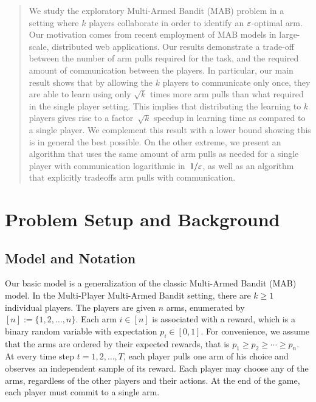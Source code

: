 \documentclass[12pt]{article}
\begin{document}
\begin{abstract}
We study the exploratory Multi-Armed Bandit (MAB) problem in a setting where $k$ players collaborate in order to identify an $\varepsilon$-optimal arm.
Our motivation comes from recent employment of MAB models in large-scale, distributed web applications.
Our results demonstrate a trade-off between the number of arm pulls required for
the task, and the required amount of communication between the players.
In particular, our main result shows that by allowing the $k$ players to communicate only once, they are able to learn using only $\sqrt{k}$ times more arm pulls than what required in the single player setting. 
This implies that distributing the learning to $k$ players gives rise to a factor~$\sqrt{k}$ speedup in learning time as compared to a single player.
We complement this result with a lower bound showing this is in general the best possible. 
On the other extreme, we present an algorithm that uses the same amount of arm pulls as needed for a single player with communication logarithmic in~$1/\varepsilon$, as well as an algorithm that explicitly tradeoffs arm pulls with communication.
\end{abstract}











\section{Problem Setup and Background}
\label{sec:prelims}


\subsection{Model and Notation}

Our basic model is a generalization of the classic Multi-Armed Bandit (MAB) model.
In the Multi-Player Multi-Armed Bandit setting, there are $k \ge 1$ individual players. The players are given $n$ arms, enumerated by $[n] := \{1,2,\ldots,n\}$.
Each arm $i \in [n]$ is associated with a reward, which is a binary random variable with expectation $p_i \in [0,1]$.
For convenience, we assume that the arms are ordered by their expected rewards, that is $p_1 \ge p_2 \ge \cdots \ge p_n$.
At every time step $t=1,2,\ldots,T$, each player pulls one arm of his choice and observes an independent sample of its reward. 
Each player may choose any of the arms, regardless of the other players and their actions.
At the end of the game, each player must commit to a single arm. 
\end{document}
